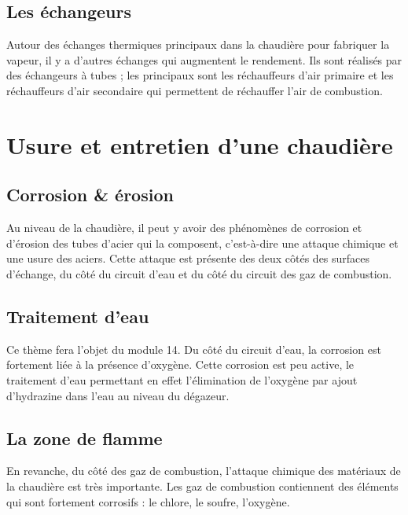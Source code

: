 \subsection{Les échangeurs}

Autour des échanges thermiques principaux dans la chaudière pour fabriquer la vapeur, il y a d’autres échanges qui augmentent le rendement. Ils sont réalisés par des échangeurs à tubes ; les principaux sont les réchauffeurs d’air primaire et les réchauffeurs d’air secondaire qui permettent de réchauffer l’air de combustion.



\section{Usure et entretien d’une chaudière}

\subsection{Corrosion \& érosion} 


Au niveau de la chaudière, il peut y avoir des phénomènes de corrosion et d’érosion des tubes d’acier qui la composent, c’est-à-dire une attaque chimique et une usure des aciers.
Cette attaque est présente des deux côtés des surfaces d’échange, du côté du circuit d’eau et du côté du circuit des gaz de combustion.



\subsection{Traitement d'eau}

Ce thème fera l’objet du module 14.
Du côté du circuit d’eau, la corrosion est fortement liée à la présence d’oxygène. Cette corrosion est peu active, le traitement d’eau permettant en effet l’élimination de l’oxygène par ajout d’hydrazine dans l’eau au niveau du dégazeur.


\subsection{La zone de flamme}

En revanche, du côté des gaz de combustion, l’attaque chimique des matériaux de la chaudière est très importante. Les gaz de combustion contiennent des éléments qui sont fortement corrosifs : le chlore, le soufre, l’oxygène.
\vspace{0.3cm}

